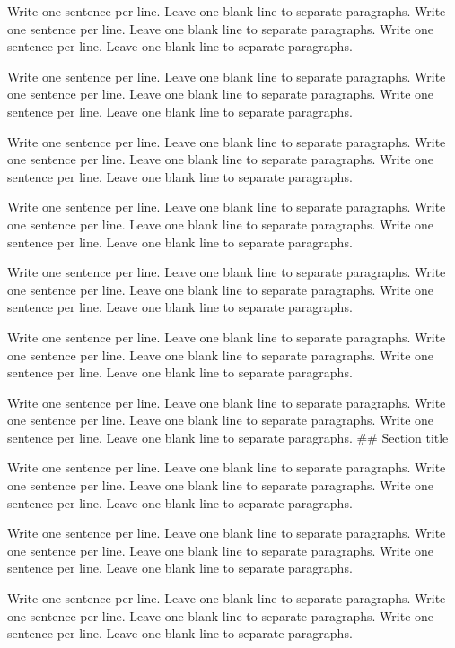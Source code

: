\documentclass[a4paper, nobind]{templates/ociamthesis}
\begin{document}
Write one sentence per line.
Leave one blank line to separate paragraphs.
Write one sentence per line.
Leave one blank line to separate paragraphs.
Write one sentence per line.
Leave one blank line to separate paragraphs.

Write one sentence per line.
Leave one blank line to separate paragraphs.
Write one sentence per line.
Leave one blank line to separate paragraphs.
Write one sentence per line.
Leave one blank line to separate paragraphs.

Write one sentence per line.
Leave one blank line to separate paragraphs.
Write one sentence per line.
Leave one blank line to separate paragraphs.
Write one sentence per line.
Leave one blank line to separate paragraphs.

Write one sentence per line.
Leave one blank line to separate paragraphs.
Write one sentence per line.
Leave one blank line to separate paragraphs.
Write one sentence per line.
Leave one blank line to separate paragraphs.

Write one sentence per line.
Leave one blank line to separate paragraphs.
Write one sentence per line.
Leave one blank line to separate paragraphs.
Write one sentence per line.
Leave one blank line to separate paragraphs.

Write one sentence per line.
Leave one blank line to separate paragraphs.
Write one sentence per line.
Leave one blank line to separate paragraphs.
Write one sentence per line.
Leave one blank line to separate paragraphs.

Write one sentence per line.
Leave one blank line to separate paragraphs.
Write one sentence per line.
Leave one blank line to separate paragraphs.
Write one sentence per line.
Leave one blank line to separate paragraphs.
\#\# Section title

Write one sentence per line.
Leave one blank line to separate paragraphs.
Write one sentence per line.
Leave one blank line to separate paragraphs.
Write one sentence per line.
Leave one blank line to separate paragraphs.

Write one sentence per line.
Leave one blank line to separate paragraphs.
Write one sentence per line.
Leave one blank line to separate paragraphs.
Write one sentence per line.
Leave one blank line to separate paragraphs.

Write one sentence per line.
Leave one blank line to separate paragraphs.
Write one sentence per line.
Leave one blank line to separate paragraphs.
Write one sentence per line.
Leave one blank line to separate paragraphs.
\end{document}
